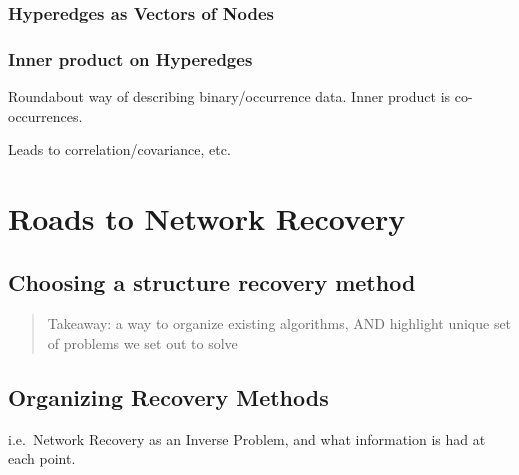 \documentclass[%
	12pt,
		oneside,
		letterpaper
]{book}
\begin{document}
\subsection{Hyperedges as Vectors of
Nodes}\label{hyperedges-as-vectors-of-nodes}

\subsection{Inner product on
Hyperedges}\label{inner-product-on-hyperedges}

Roundabout way of describing binary/occurrence data. Inner product is
co-occurrences.

Leads to correlation/covariance, etc.

\chapter{Roads to Network Recovery}\label{roads-to-network-recovery}

\section{Choosing a structure recovery
method}\label{choosing-a-structure-recovery-method}

\begin{quote}
Takeaway: a way to organize existing algorithms, AND highlight unique
set of problems we set out to solve
\end{quote}

\section{Organizing Recovery Methods}\label{organizing-recovery-methods}

i.e.~Network Recovery as an Inverse Problem, and what information is had
at each point.
\end{document}
